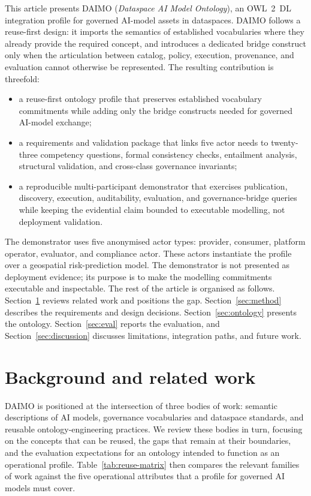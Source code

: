 \documentclass[11pt,a4paper]{article}
\begin{document}
This article presents DAIMO (\emph{Dataspace AI Model Ontology}), an OWL~2~DL integration profile for governed AI-model assets in dataspaces. DAIMO follows a reuse-first design: it imports the semantics of established vocabularies where they already provide the required concept, and introduces a dedicated bridge construct only when the articulation between catalog, policy, execution, provenance, and evaluation cannot otherwise be represented. The resulting contribution is threefold:

\begin{itemize}[leftmargin=*]
\item a reuse-first ontology profile that preserves established vocabulary commitments while adding only the bridge constructs needed for governed AI-model exchange;
\item a requirements and validation package that links five actor needs to twenty-three competency questions, formal consistency checks, entailment analysis, structural validation, and cross-class governance invariants;
\item a reproducible multi-participant demonstrator that exercises publication, discovery, execution, auditability, evaluation, and governance-bridge queries while keeping the evidential claim bounded to executable modelling, not deployment validation.
\end{itemize}

The demonstrator uses five anonymised actor types: provider, consumer, platform operator, evaluator, and compliance actor. These actors instantiate the profile over a geospatial risk-prediction model. The demonstrator is not presented as deployment evidence; its purpose is to make the modelling commitments executable and inspectable. The rest of the article is organised as follows. Section~\ref{sec:related} reviews related work and positions the gap. Section~\ref{sec:method} describes the requirements and design decisions. Section~\ref{sec:ontology} presents the ontology. Section~\ref{sec:eval} reports the evaluation, and Section~\ref{sec:discussion} discusses limitations, integration paths, and future work.


\section{Background and related work}\label{sec:related}

DAIMO is positioned at the intersection of three bodies of work: semantic descriptions of AI models, governance vocabularies and dataspace standards, and reusable ontology-engineering practices. We review these bodies in turn, focusing on the concepts that can be reused, the gaps that remain at their boundaries, and the evaluation expectations for an ontology intended to function as an operational profile. Table~\ref{tab:reuse-matrix} then compares the relevant families of work against the five operational attributes that a profile for governed AI models must cover.
\end{document}

